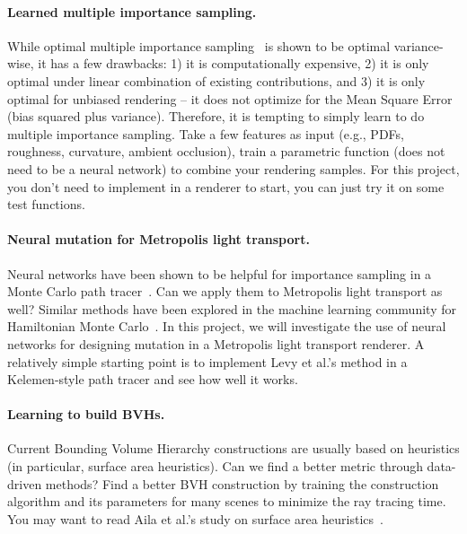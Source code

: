 \paragraph{Learned multiple importance sampling.}
While optimal multiple importance sampling~\cite{Kondapaneni:2019:OMI} is shown to be optimal variance-wise, it has a few drawbacks: 1) it is computationally expensive, 2) it is only optimal under linear combination of existing contributions, and 3) it is only optimal for unbiased rendering -- it does not optimize for the Mean Square Error (bias squared plus variance). Therefore, it is tempting to simply learn to do multiple importance sampling. Take a few features as input (e.g., PDFs, roughness, curvature, ambient occlusion), train a parametric function (does not need to be a neural network) to combine your rendering samples. For this project, you don't need to implement in a renderer to start, you can just try it on some test functions.

\paragraph{Neural mutation for Metropolis light transport.}
Neural networks have been shown to be helpful for importance sampling in a Monte Carlo path tracer~\cite{Muller:2019:NIS}.
Can we apply them to Metropolis light transport as well?
Similar methods have been explored in the machine learning community for Hamiltonian Monte Carlo~\cite{Levy:2018:GHM}.
In this project, we will investigate the use of neural networks for designing mutation in a Metropolis light transport renderer.
A relatively simple starting point is to implement Levy et al.'s method in a Kelemen-style path tracer and see how well it works. 

\paragraph{Learning to build BVHs.}
Current Bounding Volume Hierarchy constructions are usually based on heuristics (in particular, surface area heuristics). Can we find a better metric through data-driven methods? Find a better BVH construction by training the construction algorithm and its parameters for many scenes to minimize the ray tracing time. You may want to read Aila et al.'s study on surface area heuristics~\cite{Aila:2013:QMB}.

